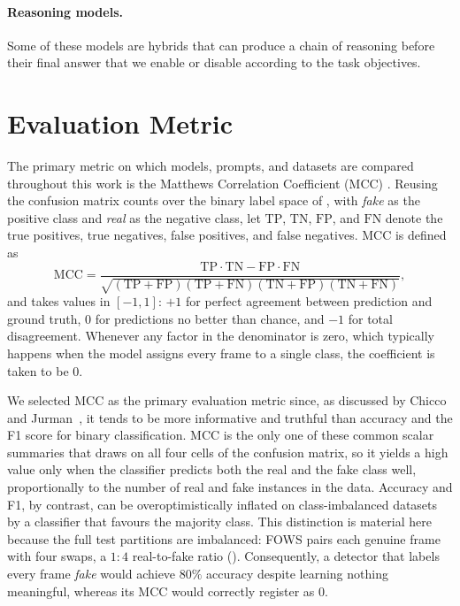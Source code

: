 \paragraph{Reasoning models.}
Some of these models are hybrids that can produce a chain of reasoning before their final answer that we enable or disable according to the task objectives.

\section{Evaluation Metric}
\label{sec:metric}

The primary metric on which models, prompts, and datasets are compared throughout this work is the Matthews Correlation Coefficient (MCC) \cite{mcc}. Reusing the confusion matrix counts over the binary label space of , with \emph{fake} as the positive class and \emph{real} as the negative class, let $\mathrm{TP}$, $\mathrm{TN}$, $\mathrm{FP}$, and $\mathrm{FN}$ denote the true positives, true negatives, false positives, and false negatives. MCC is defined as
\begin{equation}
	\text{MCC} = \frac{\mathrm{TP}\cdot\mathrm{TN} - \mathrm{FP}\cdot\mathrm{FN}}{\sqrt{(\mathrm{TP}+\mathrm{FP})(\mathrm{TP}+\mathrm{FN})(\mathrm{TN}+\mathrm{FP})(\mathrm{TN}+\mathrm{FN})}} ,
	\label{eq:mcc}
\end{equation}
and takes values in $[-1, 1]$: $+1$ for perfect agreement between prediction and ground truth, $0$ for predictions no better than chance, and $-1$ for total disagreement. Whenever any factor in the denominator is zero, which typically happens when the model assigns every frame to a single class, the coefficient is taken to be $0$.

We selected MCC as the primary evaluation metric since, as discussed by Chicco and Jurman~\cite{mcc}, it tends to be more informative and truthful than accuracy and the F1 score for binary classification. MCC is the only one of these common scalar summaries that draws on all four cells of the confusion matrix, so it yields a high value only when the classifier predicts both the real and the fake class well, proportionally to the number of real and fake instances in the data. Accuracy and F1, by contrast, can be overoptimistically inflated on class-imbalanced datasets by a classifier that favours the majority class. This distinction is material here because the full test partitions are imbalanced: FOWS pairs each genuine frame with four swaps, a $1{:}4$ real-to-fake ratio (). Consequently, a detector that labels every frame \emph{fake} would achieve $80\%$ accuracy despite learning nothing meaningful, whereas its MCC would correctly register as $0$. 

